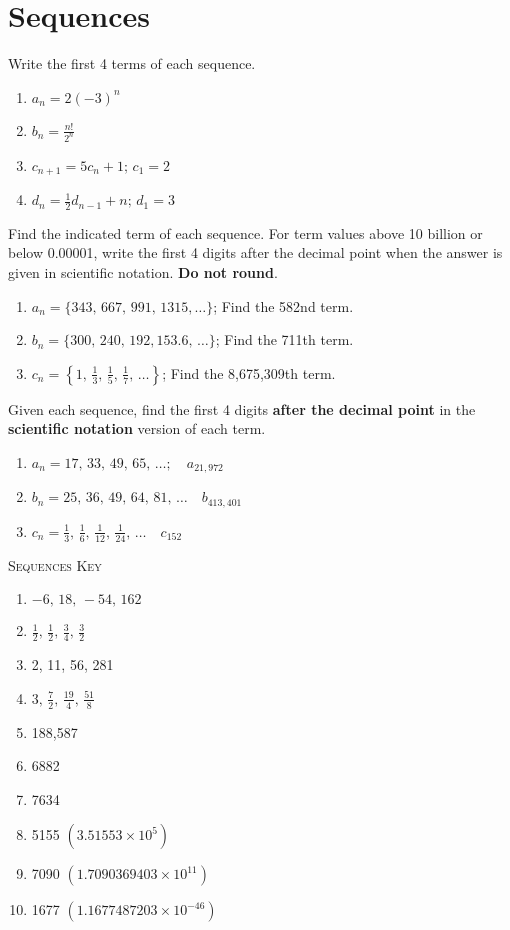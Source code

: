 \chapter{Sequences}

Write the first 4 terms of each sequence.
\begin{enumerate}
	\item $a_n = 2(-3)^n$
	\item $b_n = \frac{n!}{2^n}$
	\item $c_{n+1} = 5c_n + 1; \, c_1 = 2$
	\item $d_{n} = \frac{1}{2}d_{n-1} + n; \, d_1 = 3$
\end{enumerate}	\setcounter{Review}{\value{enumi}}

Find the indicated term of each sequence. For term values above 10 billion or below 0.00001, write the first 4 digits after the decimal point when the answer is given in scientific notation. \textbf{Do not round}.
\begin{enumerate}   \setcounter{enumi}{\value{Review}}
    \item $a_n = \{343, \, 667, \, 991, \, 1315, \dots\}$; Find the 582nd term.
    \item $b_n = \{300, \, 240, \, 192, 153.6, \, \dots\}$; Find the 711th term.
    \item $c_n = \left\{ 1, \, \frac{1}{3}, \, \frac{1}{5}, \, \frac{1}{7}, \, \dots\right\}$; Find the 8,675,309th term.
    \end{enumerate}
    \setcounter{Review}{\value{enumi}}
    
Given each sequence, find the first 4 digits \textbf{after the decimal point} in the \textbf{scientific notation} version of each term. 
\begin{enumerate}	\setcounter{enumi}{\value{Review}}
	\item $a_n = 17, \, 33, \, 49, \, 65, \, \dots; \quad a_{21,972}$
	\item $b_n = 25, \, 36, \, 49, \, 64, \, 81, \, \dots \quad b_{413,401}$
	\item $c_n = \frac{1}{3}, \, \frac{1}{6}, \, \frac{1}{12}, \, \frac{1}{24}, \, \dots \quad c_{152}$
\end{enumerate}	\setcounter{Review}{\value{enumi}}

\newpage

\textsc{Sequences Key}

\begin{enumerate}
	\item $-6, \, 18, \, -54, \, 162$
    \item $\frac{1}{2}, \, \frac{1}{2}, \, \frac{3}{4}, \, \frac{3}{2}$
    \item 2, 11, 56, 281
    \item $3, \, \frac{7}{2}, \, \frac{19}{4}, \, \frac{51}{8}$
    \item 188,587
    \item 6882
    \item 7634
    \item 5155 $(3.51553 \times 10^5)$
	\item 7090 $(1.7090369403 \times 10^{11})$
	\item 1677 $(1.1677487203 \times 10^{-46})$
\end{enumerate}